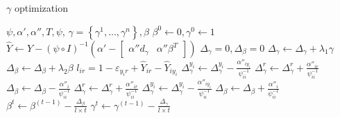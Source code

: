 \begin{algorithm}\label{alg:1}
       \caption{$\gamma$ optimization}\label{alg:1}
        \begin{algorithmic}[1]
            \REQUIRE $\psi,\alpha',\alpha'',T,\psi$,
            \ENSURE $\gamma=\left\{\gamma^1,...,\gamma^n\right\}, \beta$
            \STATE $\beta^0\leftarrow 0, \gamma^0 \leftarrow 1$
                \STATE $\hat Y \leftarrow Y - {\left( {\psi \circ I} \right)^{ - 1}}\left( {\alpha' - \left[ {\begin{array}{*{20}{c}}
{\alpha''d_\gamma }&{\alpha''\beta^T }
\end{array}} \right]} \right)$
                \STATE ${\Delta _\gamma }=0, {\Delta _\beta }=0$
                	\STATE ${\Delta _\gamma }\leftarrow {\Delta _\gamma }+\lambda_1\gamma$ 
                	\STATE ${\Delta _\beta }\leftarrow {\Delta _\beta }+\lambda_2\beta$
	                    \STATE $l_{ir} = 1 - {\varepsilon _{{y_i}r}} + {\hat Y_{ir}} - {\hat Y_{i{y_i}}}$
	                            \STATE $\Delta _\gamma^{{y_i}} \leftarrow \Delta _\gamma^{{y_i}} - \frac{{{\alpha''_{i{y_i}}}}}{{{\psi^{-1}_{ii}}}}$%
	                            \STATE $\Delta _\gamma^{{r}} \leftarrow \Delta _\gamma^{{r}} + \frac{{{\alpha''_{i{r}}}}}{{{\psi^{-1}_{ii}}}}$%
	                            \STATE ${\Delta _\beta } \leftarrow {\Delta _\beta } - \frac{{{\alpha''_i}}}{{{\psi^{-1}_{ii}}}}$
	                             \STATE $\Delta _\gamma^{{r}} \leftarrow \Delta _\gamma^{{r}} + \frac{{{\alpha''_{i{r}}}}}{{{\psi^{-1}_{ii}}}}$%
	                        \ELSE
	                            \STATE $\Delta _\gamma^{{y_i}} \leftarrow \Delta _\gamma^{{y_i}} - \frac{{{\alpha''_{i{y_i}}}}}{{{\psi^{-1}_{ii}}}}$
	                             \STATE        ${\Delta _\beta } \leftarrow {\Delta _\beta } + \frac{{{\alpha''_i}}}{{{\psi^{-1}_{ii}}}}$
	                        \ENDIF
	                    \ENDIF
	                 \ENDFOR %
                \ENDFOR %
                \STATE $\beta^t \leftarrow \beta^{(t-1)} - \frac{{{\Delta _\beta }}}{{l \times {t} }}$
                \STATE $\gamma^t  \leftarrow \gamma^{(t-1)}  - \frac{{{\Delta _\gamma }}}{{l\times {t} }}$
             \ENDFOR %
        \end{algorithmic}
\end{algorithm}